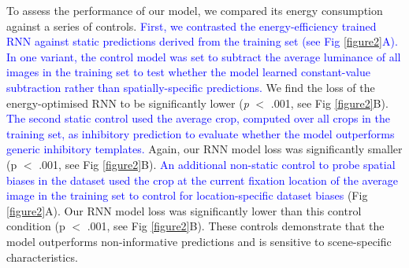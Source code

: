 \documentclass[10pt,letterpaper]{article}
\begin{document}
To assess the performance of our model, we compared its energy consumption against a series of controls. \textcolor{blue}{First, we contrasted the energy-efficiency trained RNN against static predictions derived from the training set (see Fig \ref{figure2}A). In one variant, the control model was set to subtract the average luminance of all images in the training set to test whether the model learned constant-value subtraction rather than spatially-specific predictions.} We find the loss of the energy-optimised RNN to be significantly lower (\textit{p} $<$ .001, see Fig \ref{figure2}B). \textcolor{blue}{The second static control used the average crop, computed over all crops in the training set, as inhibitory prediction to evaluate whether the model outperforms generic inhibitory templates.} Again, our RNN model loss was significantly smaller (p $<$ .001, see Fig \ref{figure2}B). \textcolor{blue}{An additional non-static control to probe spatial biases in the dataset used the crop at the current fixation location of the average image in the training set to control for location-specific dataset biases} (Fig \ref{figure2}A). Our RNN model loss was significantly lower than this control condition (p $<$ .001, see Fig \ref{figure2}B). These controls demonstrate that the model outperforms non-informative predictions and is sensitive to scene-specific characteristics.
\end{document}
